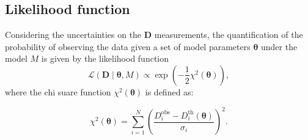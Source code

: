 \documentclass[final,3p,times]{elsarticle}
\begin{document}
\subsection{Likelihood function}
\label{subsec:likelihood}

Considering the uncertainties on the $\boldsymbol{D}$ measurements, the quantification of the probability of observing the data given a set of model parameters $\boldsymbol{\theta}$ under the model $M$ is given by the likelihood function
\begin{equation}
    \mathcal{L}(\mathbf{D} \mid \boldsymbol{\theta}, M) \propto \exp\left(-\frac{1}{2} \chi^2(\boldsymbol{\theta}) \right),
    \label{eq:likelihood_gaussian}
\end{equation}
where the chi suare function $\chi^2(\boldsymbol{\theta})$ is defined as:

\begin{equation}
    \chi^2(\boldsymbol{\theta}) = \sum_{i=1}^{N} \left( \frac{D_i^{\mathrm{obs}} - D_i^{\mathrm{th}}(\boldsymbol{\theta})}{\sigma_i} \right)^2.
    \label{eq:chi2_definition}
\end{equation}
\end{document}
